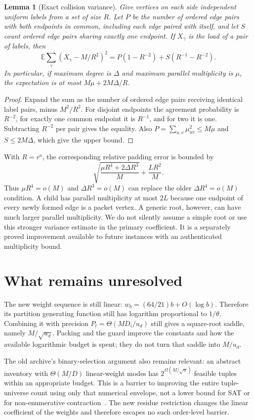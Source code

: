 \documentclass[11pt,letterpaper]{article}
\newtheorem{lemma}[theorem]{Lemma}
\theoremstyle{definition}\newtheorem{definition}[theorem]{Definition}
\theoremstyle{remark}\newtheorem{remark}[theorem]{Remark}
\begin{document}
\begin{lemma}[Exact collision variance]\label{lem:variance}
Give vertices on each side independent uniform labels from a set of
size $R$. Let $P$ be the number of ordered edge pairs with both endpoints
in common, including each edge paired with itself, and let $S$ count
ordered edge pairs sharing exactly one endpoint. If $X_\gamma$ is the
load of a pair of labels, then
\[
 \mathbb E\sum_\gamma(X_\gamma-M/R^2)^2
 =P(1-R^{-2})+S(R^{-1}-R^{-2}).
\]
In particular, if maximum degree is $\Delta$ and maximum parallel
multiplicity is $\mu$, the expectation is at most
$M\mu+2M\Delta/R$.
\end{lemma}
\begin{proof}
Expand the sum as the number of ordered edge pairs receiving identical
label pairs, minus $M^2/R^2$. For disjoint endpoints the agreement
probability is $R^{-2}$, for exactly one common endpoint it is
$R^{-1}$, and for two it is one. Subtracting $R^{-2}$ per pair
gives the equality. Also $P=\sum_{u,v}\mu_{uv}^2\le M\mu$
and $S\le2M\Delta$, which give the upper bound.
\end{proof}

With $R=r^a$, the corresponding relative padding error is bounded by
\[
 \sqrt{\frac{\mu R^4+2\Delta R^3}{M}}+\frac{LR^2}{M}.
\]
Thus $\mu R^4=o(M)$ and $\Delta R^3=o(M)$ can replace
the older $\Delta R^4=o(M)$ condition. A child has parallel
multiplicity at most $2L$ because one endpoint of every newly formed
edge is a packet vertex. A generic root, however, can have much
larger parallel multiplicity. We do not silently assume a simple root
or use this stronger variance estimate in the primary coefficient.
It is a separately proved improvement available to future instances
with an authenticated multiplicity bound.

\section{What remains unresolved}\label{sec:limits}
The new weight sequence is still linear:
$w_b=(64/21)b+O(\log b)$. Therefore its partition generating
function still has logarithm proportional to $1/\theta$.
Combining it with precision $P_t=\Theta(MD_i/u_d)$ still gives
a square-root saddle, namely $M/\sqrt{u_d}$. Packing and the
guard improve the constants and how the available logarithmic
budget is spent; they do not turn that saddle into $M/u_d$.

The old archive's binary-selection argument also remains relevant:
an abstract inventory with $\Theta(M/D)$ linear-weight modes has
$2^{\Omega(M/\sqrt u)}$ feasible tuples within an appropriate
budget. This is a barrier to improving the entire tuple-universe
count using only that numerical envelope, not a lower bound for
SAT or for non-enumerative contraction~\cite{analysispacket,cauchypacket}.
The new residue restriction changes the linear coefficient of the
weights and therefore escapes no such order-level barrier.
\end{document}
